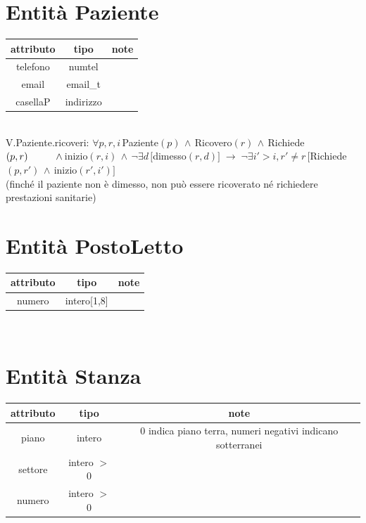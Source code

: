 \documentclass[a4paper,12pt]{report}
\begin{document}
      \section*{Entità Paziente}
        \begin{tabular}{|c|c|c|}
	        \hline attributo & tipo & note \\
	        \hline telefono & numtel & \\
	        \hline email & email\_t & \\
	        \hline casellaP & indirizzo & \\
	        \hline
        \end{tabular} \\
        V.Paziente.ricoveri: $\forall p,r,i \, $Paziente$(p) \,\wedge\, $Ricovero$(r) \,\wedge\, $Richiede$(p, r) \\
        \hspace*{1cm}\wedge\, $inizio$(r, i) \,\wedge\, \neg\exists d\, [$dimesso$(r, d)] \;\rightarrow\; \neg\exists i' > i,r' \neq r \, [$Richiede$(p, r') \,\wedge\, $inizio$(r', i')]$ \\
        (finché il paziente non è dimesso, non può essere ricoverato né richiedere prestazioni sanitarie) \\

      \section*{Entità PostoLetto}
        \begin{tabular}{|c|c|c|}
	        \hline attributo & tipo & note \\
	        \hline numero & intero[1,8] & \\
	        \hline
        \end{tabular} \\

      \section*{Entità Stanza}
        \begin{tabular}{|c|c|c|}
	        \hline attributo & tipo & note \\
	        \hline piano & intero & 0 indica piano terra, numeri negativi indicano sotterranei \\
	        \hline settore & intero $>$ 0 & \\
	        \hline numero & intero $>$ 0 & \\
	        \hline
        \end{tabular} \\
\end{document}
